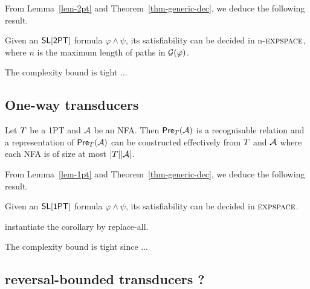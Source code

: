 From Lemma~\ref{lem-2pt} and Theorem~\ref{thm-generic-dec}, we deduce the following result.
%
\begin{corollary}
Given an $\textsf{SL}[\textsf{2PT}]$ formula $\varphi \wedge \psi$, its satisfiability can be decided in n-$\textsc{expspace}$, where $n$ is the maximum length of paths in $\mathcal{G}(\varphi)$. 
\end{corollary}

The complexity bound is tight ...

\subsection{One-way transducers}


\begin{lemma}\label{lem-1pt}
Let $T$ be a 1PT and $\mathcal{A}$ be an NFA. Then $\textsf{Pre}_{T}(\mathcal{A})$ is a recognisable relation and a representation of $\textsf{Pre}_{T}(\mathcal{A})$ can be constructed effectively from $T$ and $\mathcal{A}$ where each NFA is of size at most $|T||\mathcal{A}|$.
\end{lemma}

From Lemma~\ref{lem-1pt} and Theorem~\ref{thm-generic-dec}, we deduce the following result.
%
\begin{corollary}
Given an $\textsf{SL}[\textsf{1PT}]$ formula $\varphi \wedge \psi$, its satisfiability can be decided in $\textsc{expspace}$. 
\end{corollary}

\begin{remark}
	instantiate the corollary by replace-all. 
\end{remark}

The complexity bound is tight since ...
\subsection{reversal-bounded transducers ?}

